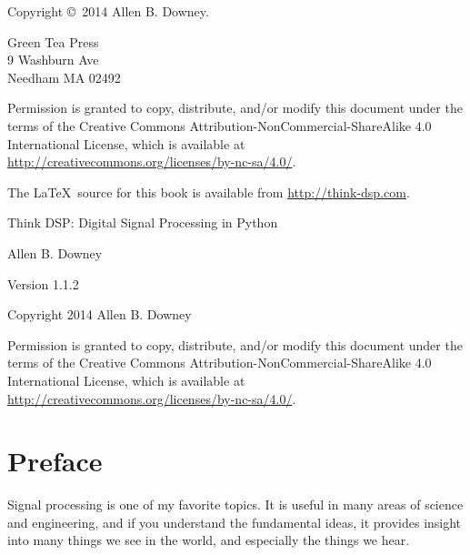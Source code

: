 \documentclass[12pt]{book}
\newcommand{\thetitle}{Think DSP}
\newcommand{\thesubtitle}{Digital Signal Processing in Python}
\newcommand{\theversion}{1.1.2}
\begin{document}
\begin{latexonly}
Copyright \copyright ~2014 Allen B. Downey.


\vspace{0.2in}

\begin{flushleft}
Green Tea Press       \\
9 Washburn Ave \\
Needham MA 02492
\end{flushleft}

Permission is granted to copy, distribute, and/or modify this document
under the terms of the Creative Commons
Attribution-NonCommercial-ShareAlike 4.0 International License, which
is available at
\url{http://creativecommons.org/licenses/by-nc-sa/4.0/}.


The \LaTeX\ source for this book is available from
\url{http://think-dsp.com}.

\vspace{0.2in}

\end{latexonly}



\begin{htmlonly}


{\Large \thetitle: \thesubtitle}

{\large Allen B. Downey}

Version \theversion

\vspace{0.25in}

Copyright 2014 Allen B. Downey

\vspace{0.25in}

Permission is granted to copy, distribute, and/or modify this document
under the terms of the Creative Commons
Attribution-NonCommercial-ShareAlike 4.0 International License,
which is available at
\url{http://creativecommons.org/licenses/by-nc-sa/4.0/}.

\setcounter{chapter}{-1}

\end{htmlonly}

\fi

\chapter{Preface}
\label{preface}

Signal processing is one of my favorite topics.  It is useful
in many areas of science and engineering, and if you understand
the fundamental ideas, it provides insight into many things
we see in the world, and especially the things we hear.
\end{document}

